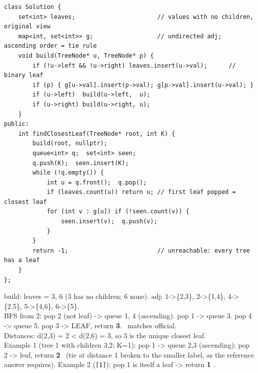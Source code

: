 \begin{lstlisting}[caption={LeetCode 742 -- undirected rebuild, then one BFS by layers}, label={lst:c09-742-soln}]
class Solution {
    set<int> leaves;                       // values with no children, original view
    map<int, set<int>> g;                  // undirected adj; ascending order = tie rule
    void build(TreeNode* u, TreeNode* p) {
        if (!u->left && !u->right) leaves.insert(u->val);      // binary leaf
        if (p) { g[u->val].insert(p->val); g[p->val].insert(u->val); }
        if (u->left)  build(u->left,  u);
        if (u->right) build(u->right, u);
    }
public:
    int findClosestLeaf(TreeNode* root, int K) {
        build(root, nullptr);
        queue<int> q;  set<int> seen;
        q.push(K);  seen.insert(K);
        while (!q.empty()) {
            int u = q.front();  q.pop();
            if (leaves.count(u)) return u; // first leaf popped = closest leaf
            for (int v : g[u]) if (!seen.count(v)) {
                seen.insert(v);  q.push(v);
            }
        }
        return -1;                         // unreachable: every tree has a leaf
    }
};
\end{lstlisting}

\begin{tracebox}[Official Example~3: edges 1-2, 1-3, 2-4, 4-5, 5-6; K = 2 $\Rightarrow$ 3]
build: leaves = {3, 6} (3 has no children; 6 none). adj: 1->\{2,3\}, 2->\{1,4\},
4->\{2,5\}, 5->\{4,6\}, 6->\{5\}.\\
BFS from 2: pop 2 (not leaf) -> queue 1, 4 (ascending).  pop 1 -> queue 3.
pop 4 -> queue 5.  pop 3 -> LEAF, return \textbf{3}. \checkmark\ matches official.\\
Distances: d(2,3) = 2 < d(2,6) = 3, so 3 is the unique closest leaf.\\
Example 1 (tree 1 with children 3,2; K=1): pop 1 -> queue 2,3 (ascending); pop 2 ->
leaf, return \textbf{2} \checkmark\ (tie at distance 1 broken to the smaller label, as
the reference answer requires). Example 2 (\texttt{[1]}): pop 1 is itself a leaf ->
return \textbf{1} \checkmark.
\end{tracebox}


